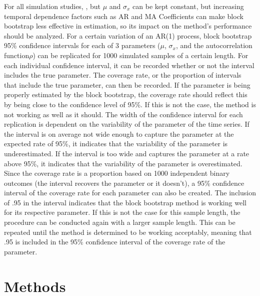 \documentclass[12pt, letterpaper, titlepage]{article}
\begin{document}
For all simulation studies, , but $\mu$ and $\sigma_{x}$ can be kept constant, but increasing temporal dependence factors such as AR and MA Coefficients can make block bootstrap less effective in estimation, so its impact on the method's performance should be analyzed. For a certain variation of an AR(1) process, block bootstrap 95\% confidence intervals for each of 3 parameters ($\mu$, $\sigma_{x}$, and the autocorrelation function$\rho$) can be replicated for 1000 simulated samples of a certain length. For each individual confidence interval, it can be recorded whether or not the interval includes the true parameter. The coverage rate, or the proportion of intervals that include the true parameter, can then be recorded. If the parameter is being properly estimated by the block bootstrap, the coverage rate should reflect this by being close to the confidence level of 95\%. If this is not the case, the method is not working as well as it should. The width of the confidence interval for each replication is dependent on the variability of the parameter of the time series. If the interval is on average not wide enough to capture the parameter at the expected rate of 95\%, it indicates that the variability of the parameter is underestimated. If the interval is too wide and captures the parameter at a rate above 95\%, it indicates that the variability of the parameter is overestimated. Since the coverage rate is a proportion based on 1000 independent binary outcomes (the interval recovers the parameter or it doesn't), a 95\% confidence interval of the coverage rate for each parameter can also be created. The inclusion of .95 in the interval indicates that the block bootstrap method is working well for its respective parameter. If this is not the case for this sample length, the procedure can be conducted again with a larger sample length. This can be repeated until the method is determined to be working acceptably, meaning that .95 is included in the 95\% confidence interval of the coverage rate of the parameter.

\section{Methods}
\label{sec:methods}
\end{document}
